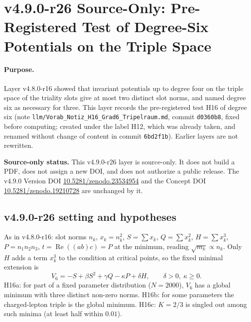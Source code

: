 \clearpage
\section*{v4.9.0-r26 Source-Only: Pre-Registered Test of Degree-Six Potentials on the Triple Space}
\label{sec:v490-r26-degree-six-triple-space}

\paragraph{Purpose.}
Layer v4.8.0-r16 showed that invariant potentials up to degree four on the triple space of the triality slots give at
most two distinct slot norms, and named degree six as necessary for three.  This layer records the pre-registered test
H16 of degree six (note \texttt{llm/Vorab\_Notiz\_H16\_Grad6\_Tripelraum.md}, commit \texttt{d0360b8}, fixed before
computing; created under the label H12, which was already taken, and renamed without change of content in commit
\texttt{6bd2f1b}).  Earlier layers are not rewritten.

\noindent\textbf{Source-only status.}
This v4.9.0-r26 layer is source-only.  It does not build a PDF, does not assign a new DOI,
and does not authorize a public release.  The v4.9.0 Version DOI
\href{https://doi.org/10.5281/zenodo.23534954}{10.5281/zenodo.23534954} and the Concept DOI
\href{https://doi.org/10.5281/zenodo.19210728}{10.5281/zenodo.19210728} are unchanged by it.

\subsection*{v4.9.0-r26 setting and hypotheses}
\label{subsec:v490-r26-setting}

As in v4.8.0-r16: slot norms \(n_k\), \(x_k=n_k^2\), \(S=\sum x_k\), \(Q=\sum x_k^2\), \(H=\sum x_k^3\),
\(P=n_1n_2n_3\), \(t=\operatorname{Re}((ab)c)=P\) at the minimum, reading \(\sqrt{m_k}\propto n_k\).  Only \(H\) adds a
term \(x_k^3\) to the condition at critical points, so the fixed minimal extension is
\[
V_6=-S+\beta S^2+\gamma Q-\kappa P+\delta H,\qquad \delta>0,\ \kappa\ge0 .
\]
H16a: for part of a fixed parameter distribution (\(N=2000\)), \(V_6\) has a global minimum with three distinct non-zero
norms.  H16b: for some parameters the charged-lepton triple is the global minimum.  H16c: \(K=2/3\) is singled out among
such minima (at least half within \(0.01\)).

